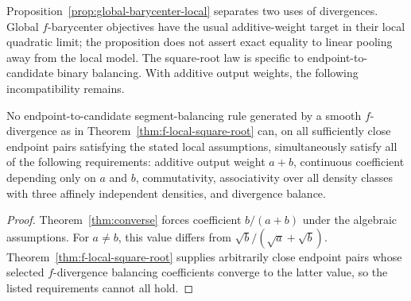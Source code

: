 \documentclass[runningheads]{llncs}
\begin{document}
Proposition~\ref{prop:global-barycenter-local} separates two uses of divergences. Global $f$-barycenter objectives have the usual additive-weight target in their local quadratic limit; the proposition does not assert exact equality to linear pooling away from the local model. The square-root law is specific to endpoint-to-candidate binary balancing. With additive output weights, the following incompatibility remains.

\begin{corollary}
\label{cor:f-incompatibility}
No endpoint-to-candidate segment-balancing rule generated by a smooth $f$-divergence as in Theorem~\ref{thm:f-local-square-root} can, on all sufficiently close endpoint pairs satisfying the stated local assumptions, simultaneously satisfy all of the following requirements: additive output weight $a+b$, continuous coefficient depending only on $a$ and $b$, commutativity, associativity over all density classes with three affinely independent densities, and divergence balance.
\end{corollary}

\begin{proof}
Theorem~\ref{thm:converse} forces coefficient $b/(a+b)$ under the algebraic assumptions. For $a\neq b$, this value differs from $\sqrt b/(\sqrt a+\sqrt b)$. Theorem~\ref{thm:f-local-square-root} supplies arbitrarily close endpoint pairs whose selected $f$-divergence balancing coefficients converge to the latter value, so the listed requirements cannot all hold.
\end{proof}
\end{document}

